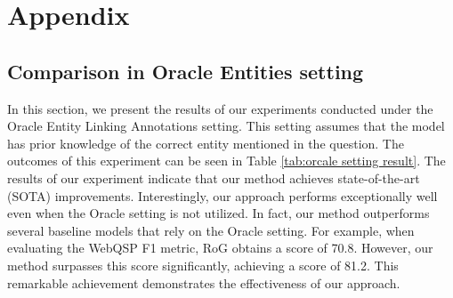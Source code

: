 
\newpage
\section{Appendix}

\subsection{Comparison in Oracle Entities setting}


In this section, we present the results of our experiments conducted under the Oracle Entity Linking Annotations setting. This setting assumes that the model has prior knowledge of the correct entity mentioned in the question. The outcomes of this experiment can be seen in Table \ref{tab:orcale setting result}.
The results of our experiment indicate that our method achieves state-of-the-art (SOTA) improvements. Interestingly, our approach performs exceptionally well even when the Oracle setting is not utilized. In fact, our method outperforms several baseline models that rely on the Oracle setting.
For example, when evaluating the WebQSP F1 metric, RoG obtains a score of 70.8. However, our method surpasses this score significantly, achieving a score of 81.2. This remarkable achievement demonstrates the effectiveness of our approach.
